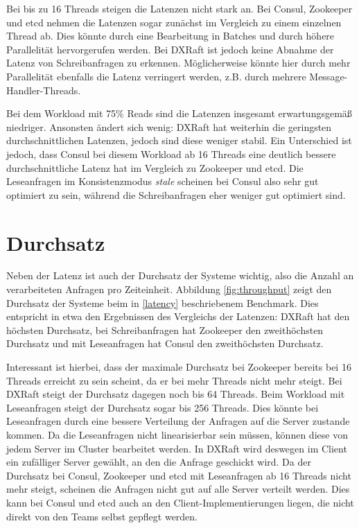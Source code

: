 Bei bis zu 16 Threads steigen die Latenzen nicht stark an. Bei Consul, Zookeeper und etcd nehmen die Latenzen sogar zunächst im Vergleich zu einem einzelnen Thread ab. Dies könnte durch eine Bearbeitung in Batches und durch höhere Parallelität hervorgerufen werden. Bei DXRaft ist jedoch keine Abnahme der Latenz von Schreibanfragen zu erkennen. Möglicherweise könnte hier durch mehr Parallelität ebenfalls die Latenz verringert werden, z.B. durch mehrere Message-Handler-Threads.

Bei dem Workload mit 75\% Reads sind die Latenzen insgesamt erwartungsgemäß niedriger. Ansonsten ändert sich wenig: DXRaft hat weiterhin die geringsten durchschnittlichen Latenzen, jedoch sind diese weniger stabil. Ein Unterschied ist jedoch, dass Consul bei diesem Workload ab 16 Threads eine deutlich bessere durchschnittliche Latenz hat im Vergleich zu Zookeeper und etcd. Die Leseanfragen im Konsistenzmodus \textit{stale} scheinen bei Consul also sehr gut optimiert zu sein, während die Schreibanfragen eher weniger gut optimiert sind.

\section{Durchsatz}
\label{throughput}

Neben der Latenz ist auch der Durchsatz der Systeme wichtig, also die Anzahl an verarbeiteten Anfragen pro Zeiteinheit. Abbildung \ref{fig:throughput} zeigt den Durchsatz der Systeme beim in \ref{latency} beschriebenem Benchmark. Dies entspricht in etwa den Ergebnissen des Vergleichs der Latenzen: DXRaft hat den höchsten Durchsatz, bei Schreibanfragen hat Zookeeper den zweithöchsten Durchsatz und mit Leseanfragen hat Consul den zweithöchsten Durchsatz.

Interessant ist hierbei, dass der maximale Durchsatz bei Zookeeper bereits bei 16 Threads erreicht zu sein scheint, da er bei mehr Threads nicht mehr steigt. Bei DXRaft steigt der Durchsatz dagegen noch bis 64 Threads. Beim Workload mit Leseanfragen steigt der Durchsatz sogar bis 256 Threads. Dies könnte bei Leseanfragen durch eine bessere Verteilung der Anfragen auf die Server zustande kommen. Da die Leseanfragen nicht linearisierbar sein müssen, können diese von jedem Server im Cluster bearbeitet werden. In DXRaft wird deswegen im Client ein zufälliger Server gewählt, an den die Anfrage geschickt wird. Da der Durchsatz bei Consul, Zookeeper und etcd mit Leseanfragen ab 16 Threads nicht mehr steigt, scheinen die Anfragen nicht gut auf alle Server verteilt werden. Dies kann bei Consul und etcd auch an den Client-Implementierungen liegen, die nicht direkt von den Teams selbst gepflegt werden.

